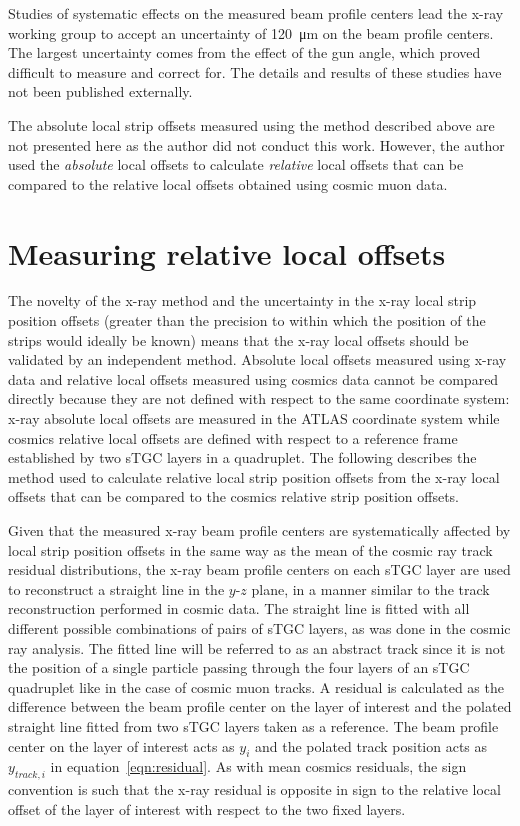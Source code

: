 Studies of systematic effects on the measured beam profile centers lead the x-ray working group to accept an uncertainty of \SI{120}{\micro\meter} on the beam profile centers. The largest uncertainty comes from the effect of the gun angle, which proved difficult to measure and correct for. The details and results of these studies have not been published externally. 

The absolute local strip offsets measured using the method described above are not presented here as the author did not conduct this work. However, the author used the {\em absolute} local offsets to calculate {\em relative} local offsets that can be compared to the relative local offsets obtained using cosmic muon data.

\section{Measuring relative local offsets}

The novelty of the x-ray method and the uncertainty in the x-ray local strip position offsets (greater than the precision to within which the position of the strips would ideally be known) means that the x-ray local offsets should be validated by an independent method. Absolute local offsets measured using x-ray data and relative local offsets measured using cosmics data cannot be compared directly because they are not defined with respect to the same coordinate system: x-ray absolute local offsets are measured in the ATLAS coordinate system while cosmics relative local offsets are defined with respect to a reference frame established by two sTGC layers in a quadruplet. The following describes the method used to calculate relative local strip position offsets from the x-ray local offsets that can be compared to the cosmics relative strip position offsets.

Given that the measured x-ray beam profile centers are systematically affected by local strip position offsets in the same way as the mean of the cosmic ray track residual distributions, the x-ray beam profile centers on each sTGC layer are used to reconstruct a straight line in the $y$-$z$ plane, in a manner similar to the track reconstruction performed in cosmic data. The straight line is fitted with all different possible combinations of pairs of sTGC layers, as was done in the cosmic ray analysis. The fitted line will be referred to as an abstract track since it is not the position of a single particle passing through the four layers of an sTGC quadruplet like in the case of cosmic muon tracks. A residual is calculated as the difference between the beam profile center on the layer of interest and the polated straight line fitted from two sTGC layers taken as a reference. The beam profile center on the layer of interest acts as $y_{i}$ and the polated track position acts as $y_{track, i}$ in equation~\ref{eqn:residual}.  As with mean cosmics residuals, the sign convention is such that the x-ray residual is opposite in sign to the relative local offset of the layer of interest with respect to the two fixed layers. 

